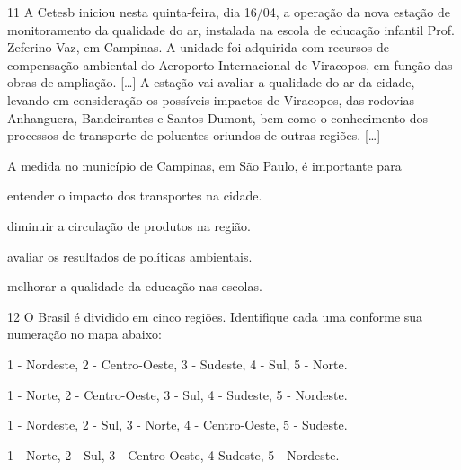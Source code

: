 \num{11} A Cetesb iniciou nesta quinta-feira, dia 16/04, a operação da nova
estação de monitoramento da qualidade do ar, instalada na escola de
educação infantil Prof. Zeferino Vaz, em Campinas. A unidade foi
adquirida com recursos de compensação ambiental do Aeroporto
Internacional de Viracopos, em função das obras de ampliação. {[}\ldots{}{]} A estação
vai avaliar a qualidade do ar da cidade, levando em consideração os
possíveis impactos de Viracopos, das rodovias Anhanguera, Bandeirantes e
Santos Dumont, bem como o conhecimento dos processos de transporte de
poluentes oriundos de outras regiões. {[}\ldots{}{]}


A medida no município de Campinas, em São Paulo, é
importante para

\begin{escolha}
\item entender o impacto dos transportes na cidade.

\item diminuir a circulação de produtos na região.

\item avaliar os resultados de políticas ambientais.

\item melhorar a qualidade da educação nas escolas.
\end{escolha}


\num{12} O Brasil é dividido em cinco regiões. Identifique cada uma conforme sua numeração no mapa abaixo:


\begin{escolha}
\item 1 - Nordeste, 2 - Centro-Oeste, 3 - Sudeste, 4 - Sul, 5 - Norte.

\item 1 - Norte, 2 - Centro-Oeste, 3 - Sul, 4 - Sudeste, 5 - Nordeste.

\item 1 - Nordeste, 2 - Sul, 3 - Norte, 4 - Centro-Oeste, 5 - Sudeste.

\item 1 - Norte, 2 - Sul, 3 - Centro-Oeste, 4 Sudeste, 5 - Nordeste.
\end{escolha}

